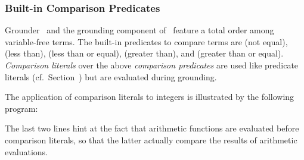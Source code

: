 \subsubsection{Built-in Comparison Predicates}\label{subsec:gringo:comp}

Grounder \gringo\ and the grounding component of \clingo\
feature a total order among variable-free terms.
The built-in predicates to compare terms are
\code{!=} (not equal),
\code{<} (less than),
\code{<=} (less than or equal),
\code{>} (greater than), and
\code{>=} (greater than or equal).
\emph{Comparison literals} over the above \emph{comparison predicates} are used like predicate literals (cf.\ Section~\pageref{subsec:gringo:normal})
but are evaluated during grounding.

\begin{example}\label{ex:arith:pred}
The application of comparison literals to integers
is illustrated by the following program:%
%

%
The last two lines hint at the fact that arithmetic functions are evaluated
before comparison literals, so that the latter actually compare the
results of arithmetic evaluations.
\eexample
\end{example}

